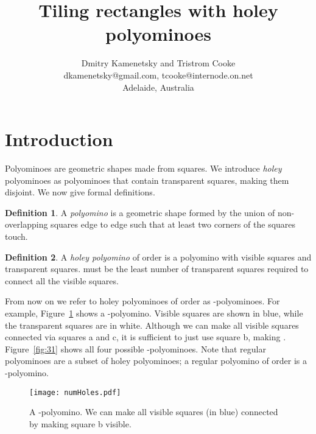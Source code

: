 \documentclass[10pt,a4paper]{article}
\theoremstyle{definition}
\newtheorem{defn}{Definition}[section]
\begin{document}
\title{Tiling rectangles with holey polyominoes}

\author{Dmitry Kamenetsky and Tristrom Cooke \\
dkamenetsky@gmail.com, tcooke@internode.on.net \\
Adelaide, Australia
}


\maketitle



\section{Introduction}

Polyominoes are geometric shapes made from squares.
We introduce \emph{holey} polyominoes as polyominoes that contain transparent squares, making them disjoint.
We now give formal definitions.

\begin{defn}
A \emph{polyomino} is a geometric shape formed by the union of non-overlapping squares edge to edge such that at least two
corners of the squares touch.
\end{defn}

\begin{defn}
A \emph{holey polyomino} of order  is a polyomino with  visible squares and  transparent squares.
 must be the least number of transparent squares required to connect all the visible squares.
\end{defn}

From now on we refer to holey polyominoes of order  as -polyominoes.
For example, Figure~\ref{fig:numHoles} shows a -polyomino.
Visible squares are shown in blue, while the
transparent squares are in white. 
Although we can make all visible squares connected
via squares a and c, it is sufficient to just use square b, making .
Figure~\ref{fig:31} shows all four possible -polyominoes.
Note that regular polyominoes are a subset of holey polyominoes; a regular polyomino of order  is a
-polyomino.

\begin{figure}[!htpb]
\centering
\texttt{[image: numHoles.pdf]}
\caption{A -polyomino. We can make all visible squares (in blue) connected by making square b visible.}
\label{fig:numHoles}
\end{figure}
\end{document}
